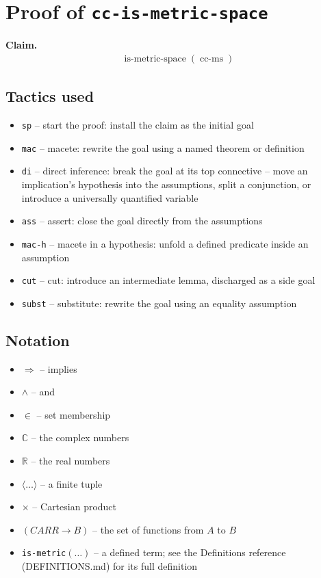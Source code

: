 \documentclass[11pt]{article}
\theoremstyle{plain}
\begin{document}
\section*{Proof of \texttt{cc-is-metric-space}}
\textbf{Claim.}
\begin{align*}
  \operatorname{is\text{-}metric\text{-}space}(\operatorname{cc\text{-}ms})
\end{align*}
\bigskip

\subsection*{Tactics used}
\begin{itemize}
\item \texttt{sp} -- start the proof: install the claim as the initial goal
\item \texttt{mac} -- macete: rewrite the goal using a named theorem or definition
\item \texttt{di} -- direct inference: break the goal at its top connective -- move an implication's hypothesis into the assumptions, split a conjunction, or introduce a universally quantified variable
\item \texttt{ass} -- assert: close the goal directly from the assumptions
\item \texttt{mac-h} -- macete in a hypothesis: unfold a defined predicate inside an assumption
\item \texttt{cut} -- cut: introduce an intermediate lemma, discharged as a side goal
\item \texttt{subst} -- substitute: rewrite the goal using an equality assumption
\end{itemize}

\subsection*{Notation}
\begin{itemize}
\item $\Rightarrow$ -- implies
\item $\wedge$ -- and
\item $\in$ -- set membership
\item $\mathbb{C}$ -- the complex numbers
\item $\mathbb{R}$ -- the real numbers
\item $\langle \ldots \rangle$ -- a finite tuple
\item $\times$ -- Cartesian product
\item $(CARR \to B)$ -- the set of functions from $A$ to $B$
\item \texttt{is-metric}$(\ldots)$ -- a defined term; see the Definitions reference (DEFINITIONS.md) for its full definition
\end{itemize}
\end{document}
